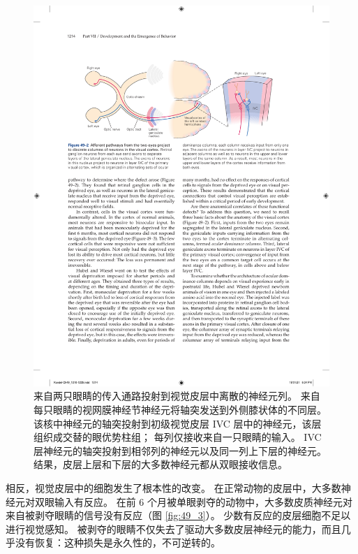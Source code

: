 \begin{figure}[htbp]
	\centering
	\includegraphics[width=0.8\linewidth]{chap49/fig_49_2}
	\caption{来自两只眼睛的传入通路投射到视觉皮层中离散的神经元列。 来自每只眼睛的视网膜神经节神经元将轴突发送到外侧膝状体的不同层。 该核中神经元的轴突投射到初级视觉皮层 IVC 层中的神经元，该层组织成交替的眼优势柱组； 每列仅接收来自一只眼睛的输入。 IVC 层神经元的轴突投射到相邻列的神经元以及同一列上下层的神经元。 结果，皮层上层和下层的大多数神经元都从双眼接收信息。}
	\label{fig:49_2}
\end{figure}

相反，视觉皮层中的细胞发生了根本性的改变。 在正常动物的皮层中，大多数神经元对双眼输入有反应。 
在前 6 个月被单眼剥夺的动物中，大多数皮质神经元对来自被剥夺眼睛的信号没有反应（图 \ref{fig:49_3}）。 
少数有反应的皮层细胞不足以进行视觉感知。 被剥夺的眼睛不仅失去了驱动大多数皮层神经元的能力，而且几乎没有恢复：这种损失是永久性的，不可逆转的。

